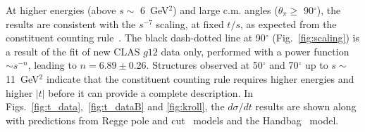 \documentclass[aps,prc,twocolumn,floatfix,showpacs,preprintnumbers,amsmath,amssymb,superscriptaddress,linenumbers]{revtex4-1}
\begin{document}

At higher energies (above $s\sim$ 6~GeV$^2$) and large c.m. angles 
($\theta_{\pi}\geq$ 90$^\circ$), the results are consistent with 
the $s^{-7}$ scaling, at fixed $t/s$, as expected from the 
constituent counting rule~\cite{Brodsky:1973kr}. 
The black dash-dotted line at 90$^\circ$ (Fig.~\ref{fig:scaling}) 
is a result of the fit of new CLAS $g12$ data only, performed with a 
power function $\sim s^{-n}$, leading to $n = 6.89\pm$0.26.  
Structures observed at 50$^\circ$ and 70$^\circ$ up to 
$s\sim$11~GeV$^2$ indicate that the constituent 
counting rule requires higher energies and higher $|t|$ before it 
can provide a complete description.
In Figs.~\ref{fig:t_data},~\ref{fig:t_dataB} and \ref{fig:kroll}, the 
$d\sigma/dt$ results are shown along with predictions from 
Regge pole and cut~\cite{Goldstein:1973xn,Laget:2005be,
Mathieu:2015eia,Donnachie:2015jaa} models and the 
Handbag~\cite{Huang:2000kd} model. 
\end{document}
